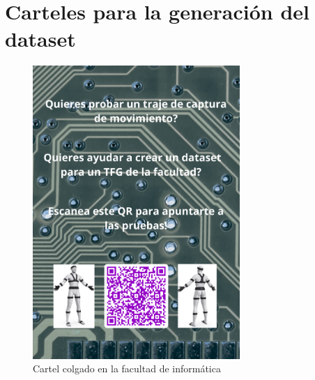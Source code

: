 \chapter{Carteles para la generación del dataset}
\label{Appendix:Key2}

\begin{figure}[H]
    \centering
    \includegraphics[width=0.7\textwidth]{Imagenes/Bitmap/cartel-imprimir.png}
    \caption{Cartel colgado en la facultad de informática}
    \label{fig:cartel-facultad}
\end{figure}
